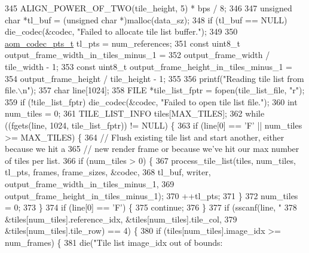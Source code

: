 \begin{DoxyCodeInclude}
{{{{{{345                          ALIGN\_POWER\_OF\_TWO(tile\_height, 5) * bps / 8;
346 
347   \textcolor{keywordtype}{unsigned} \textcolor{keywordtype}{char} *tl\_buf = (\textcolor{keywordtype}{unsigned} \textcolor{keywordtype}{char} *)malloc(data\_sz);
348   \textcolor{keywordflow}{if} (tl\_buf == NULL) die\_codec(&codec, \textcolor{stringliteral}{"Failed to allocate tile list buffer."});
349 
350   \hyperlink{group__encoder_ga958524226c9a65251c9e4f7bb78fc606}{aom\_codec\_pts\_t} tl\_pts = num\_references;
351   \textcolor{keyword}{const} uint8\_t output\_frame\_width\_in\_tiles\_minus\_1 =
352       output\_frame\_width / tile\_width - 1;
353   \textcolor{keyword}{const} uint8\_t output\_frame\_height\_in\_tiles\_minus\_1 =
354       output\_frame\_height / tile\_height - 1;
355 
356   printf(\textcolor{stringliteral}{"Reading tile list from file.\(\backslash\)n"});
357   \textcolor{keywordtype}{char} line[1024];
358   FILE *tile\_list\_fptr = fopen(tile\_list\_file, \textcolor{stringliteral}{"r"});
359   \textcolor{keywordflow}{if} (!tile\_list\_fptr) die\_codec(&codec, \textcolor{stringliteral}{"Failed to open tile list file."});
360   \textcolor{keywordtype}{int} num\_tiles = 0;
361   TILE\_LIST\_INFO tiles[MAX\_TILES];
362   \textcolor{keywordflow}{while} ((fgets(line, 1024, tile\_list\_fptr)) != NULL) \{
363     \textcolor{keywordflow}{if} (line[0] == \textcolor{charliteral}{'F'} || num\_tiles >= MAX\_TILES) \{
364       \textcolor{comment}{// Flush existing tile list and start another, either because we hit a}
365       \textcolor{comment}{// new render frame or because we've hit our max number of tiles per list.}
366       \textcolor{keywordflow}{if} (num\_tiles > 0) \{
367         process\_tile\_list(tiles, num\_tiles, tl\_pts, frames, frame\_sizes, &codec,
368                           tl\_buf, writer, output\_frame\_width\_in\_tiles\_minus\_1,
369                           output\_frame\_height\_in\_tiles\_minus\_1);
370         ++tl\_pts;
371       \}
372       num\_tiles = 0;
373     \}
374     \textcolor{keywordflow}{if} (line[0] == \textcolor{charliteral}{'F'}) \{
375       \textcolor{keywordflow}{continue};
376     \}
377     \textcolor{keywordflow}{if} (sscanf(line, \textcolor{stringliteral}{"%
378                &tiles[num\_tiles].reference\_idx, &tiles[num\_tiles].tile\_col,
379                &tiles[num\_tiles].tile\_row) == 4) \{
380       \textcolor{keywordflow}{if} (tiles[num\_tiles].image\_idx >= num\_frames) \{
381         die(\textcolor{stringliteral}{"Tile list image\_idx out of bounds: %
}}}}}}}}
\end{DoxyCodeInclude}
